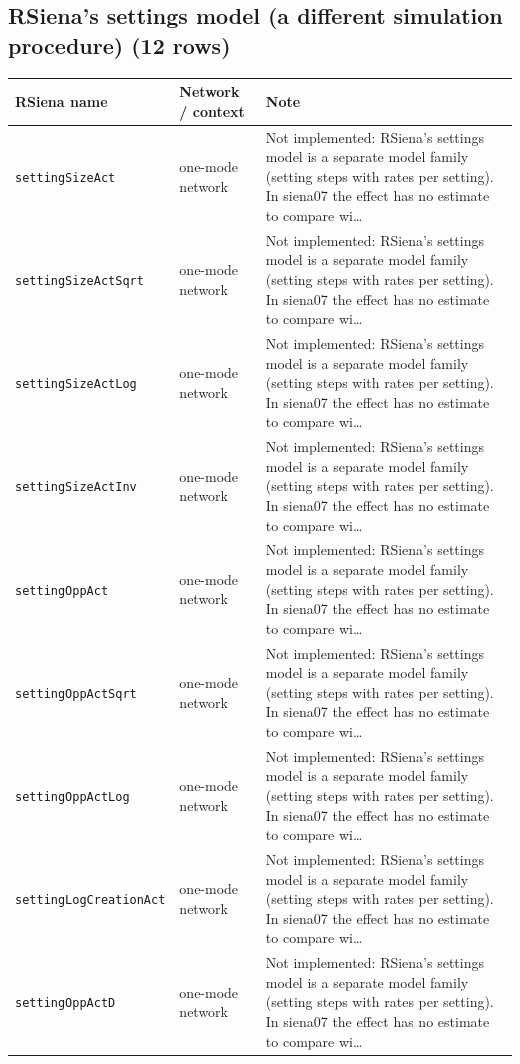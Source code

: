 \subsection*{RSiena's settings model (a different simulation procedure) (12 rows)}
\footnotesize
\begin{longtable}{@{}p{2.8cm}p{4.6cm}p{6.5cm}@{}}
\toprule
RSiena name & Network / context & Note\\
\midrule
\endhead
\texttt{settingSizeAct} & one-mode network & Not implemented: RSiena's settings model is a separate model family (setting steps with rates per setting). In siena07 the effect has no estimate to compare wi…\\
\texttt{settingSizeActSqrt} & one-mode network & Not implemented: RSiena's settings model is a separate model family (setting steps with rates per setting). In siena07 the effect has no estimate to compare wi…\\
\texttt{settingSizeActLog} & one-mode network & Not implemented: RSiena's settings model is a separate model family (setting steps with rates per setting). In siena07 the effect has no estimate to compare wi…\\
\texttt{settingSizeActInv} & one-mode network & Not implemented: RSiena's settings model is a separate model family (setting steps with rates per setting). In siena07 the effect has no estimate to compare wi…\\
\texttt{settingOppAct} & one-mode network & Not implemented: RSiena's settings model is a separate model family (setting steps with rates per setting). In siena07 the effect has no estimate to compare wi…\\
\texttt{settingOppActSqrt} & one-mode network & Not implemented: RSiena's settings model is a separate model family (setting steps with rates per setting). In siena07 the effect has no estimate to compare wi…\\
\texttt{settingOppActLog} & one-mode network & Not implemented: RSiena's settings model is a separate model family (setting steps with rates per setting). In siena07 the effect has no estimate to compare wi…\\
\texttt{settingLogCreationAct} & one-mode network & Not implemented: RSiena's settings model is a separate model family (setting steps with rates per setting). In siena07 the effect has no estimate to compare wi…\\
\texttt{settingOppActD} & one-mode network & Not implemented: RSiena's settings model is a separate model family (setting steps with rates per setting). In siena07 the effect has no estimate to compare wi…\\

\end{longtable}
